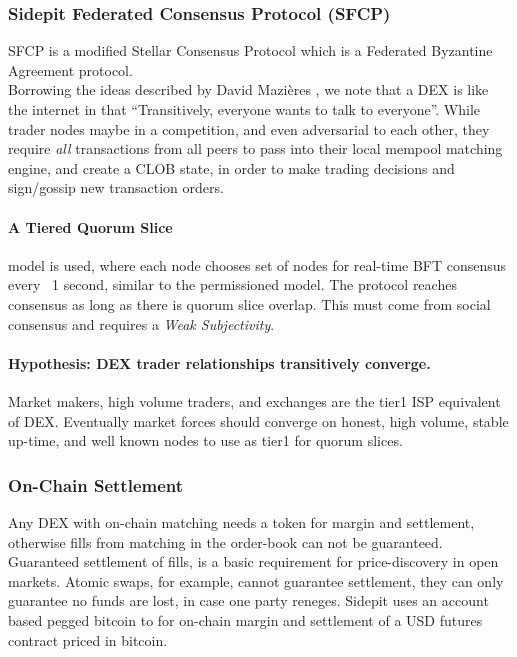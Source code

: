 \documentclass[12pt]{article}
\begin{document}
\subsubsection*{Sidepit Federated Consensus Protocol (SFCP) } 
SFCP is a modified Stellar Consensus Protocol \cite{thestellar} which is a Federated Byzantine Agreement protocol. \\

Borrowing the ideas described by David Mazières \cite{thestellar}, we note that a DEX is like the internet in that ``Transitively, everyone wants to talk to everyone''. While trader nodes maybe in a competition, and even adversarial to each other, they require \emph{all} transactions from all peers to pass into their local mempool matching engine, and create a CLOB state, in order to make trading decisions and sign/gossip new transaction orders.        

\paragraph{A Tiered Quorum Slice} model is used, where each node chooses set of nodes for real-time BFT consensus every ~1 second, similar to the permissioned model. The protocol reaches consensus as long as there is quorum slice overlap. This must come from social consensus and requires a \emph{Weak Subjectivity}.   

\paragraph{Hypothesis: DEX trader relationships transitively converge.} Market makers, high volume traders, and exchanges are the tier1 ISP equivalent of DEX. Eventually market forces should converge on honest, high volume, stable up-time, and well known nodes to use as tier1 for quorum slices.

\subsubsection*{On-Chain Settlement}
Any DEX with on-chain matching needs a token for margin and settlement, otherwise fills from matching in the order-book can not be guaranteed. Guaranteed settlement of fills, is a basic requirement for price-discovery in open markets. Atomic swaps, for example, cannot guarantee settlement, they can only guarantee no funds are lost, in case one party reneges. Sidepit uses an account based pegged bitcoin to for on-chain margin and settlement of a USD futures contract priced in bitcoin.    
 
\newpage
{}
% 

\end{document}
